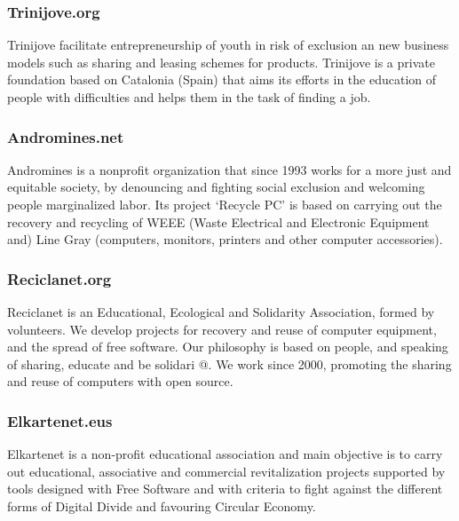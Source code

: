 \documentclass[
]{book}
\begin{document}
\hypertarget{trinijove.org}{%
\subsubsection{Trinijove.org}\label{trinijove.org}}

Trinijove facilitate entrepreneurship of youth in risk of exclusion an new business models such as sharing and leasing schemes for products. Trinijove is a private foundation based on Catalonia (Spain) that aims its efforts in the education of people with difficulties and helps them in the task of finding a job.

\hypertarget{andromines.net}{%
\subsubsection{Andromines.net}\label{andromines.net}}

Andromines is a nonprofit organization that since 1993 works for a more just and equitable society, by denouncing and fighting social exclusion and welcoming people marginalized labor. Its project `Recycle PC' is based on carrying out the recovery and recycling of WEEE (Waste Electrical and Electronic Equipment and) Line Gray (computers, monitors, printers and other computer accessories).

\hypertarget{reciclanet.org}{%
\subsubsection{Reciclanet.org}\label{reciclanet.org}}

Reciclanet is an Educational, Ecological and Solidarity Association, formed by volunteers. We develop projects for recovery and reuse of computer equipment, and the spread of free software. Our philosophy is based on people, and speaking of sharing, educate and be solidari @. We work since 2000, promoting the sharing and reuse of computers with open source.

\hypertarget{elkartenet.eus}{%
\subsubsection{Elkartenet.eus}\label{elkartenet.eus}}

Elkartenet is a non-profit educational association and main objective is to carry out educational, associative and commercial revitalization projects supported by tools designed with Free Software and with criteria to fight against the different forms of Digital Divide and favouring Circular Economy.
\end{document}

